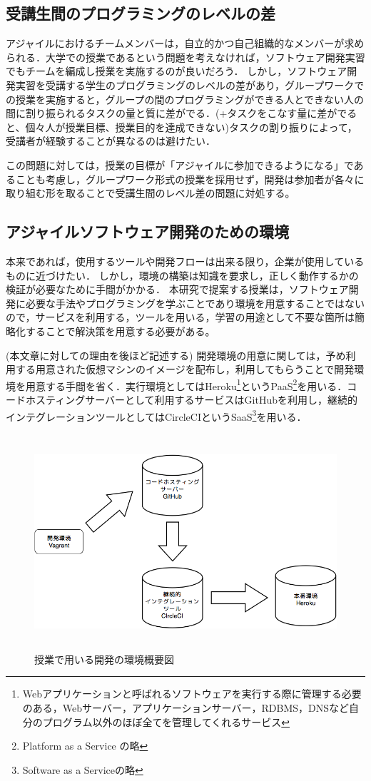 \subsection{受講生間のプログラミングのレベルの差}

アジャイルにおけるチームメンバーは，自立的かつ自己組織的なメンバーが求められる．大学での授業であるという問題を考えなければ，ソフトウェア開発実習でもチームを編成し授業を実施するのが良いだろう．
しかし，ソフトウェア開発実習を受講する学生のプログラミングのレベルの差があり，グループワークでの授業を実施すると，グループの間のプログラミングができる人とできない人の間に割り振られるタスクの量と質に差がでる．(+タスクをこなす量に差がでると、個々人が授業目標、授業目的を達成できない)タスクの割り振りによって，受講者が経験することが異なるのは避けたい．

この問題に対しては，授業の目標が「アジャイルに参加できるようになる」であることも考慮し，グループワーク形式の授業を採用せず，開発は参加者が各々に取り組む形を取ることで受講生間のレベル差の問題に対処する。

\subsection{アジャイルソフトウェア開発のための環境}

本来であれば，使用するツールや開発フローは出来る限り，企業が使用しているものに近づけたい．
しかし，環境の構築は知識を要求し，正しく動作するかの検証が必要なために手間がかかる．
本研究で提案する授業は，ソフトウェア開発に必要な手法やプログラミングを学ぶことであり環境を用意することではないので，サービスを利用する，ツールを用いる，学習の用途として不要な箇所は簡略化することで解決策を用意する必要がある。

(本文章に対しての理由を後ほど記述する)
開発環境の用意に関しては，予め利用する用意された仮想マシンのイメージを配布し，利用してもらうことで開発環境を用意する手間を省く．実行環境としてはHeroku\footnote{Webアプリケーションと呼ばれるソフトウェアを実行する際に管理する必要のある，Webサーバー，アプリケーションサーバー，RDBMS，DNSなど自分のプログラム以外のほぼ全てを管理してくれるサービス}というPaaS\footnote{Platform as a Service の略}を用いる．コードホスティングサーバーとして利用するサービスはGitHubを利用し，継続的インテグレーションツールとしてはCircleCIというSaaS\footnote{Software as a Serviceの略}を用いる．


\begin{figure}[H]
\centering
\includegraphics[height=8cm]{./assets/images/class_dev_env.png}
\caption{授業で用いる開発の環境概要図}
\label{fig:class_dev_env}
\end{figure}
